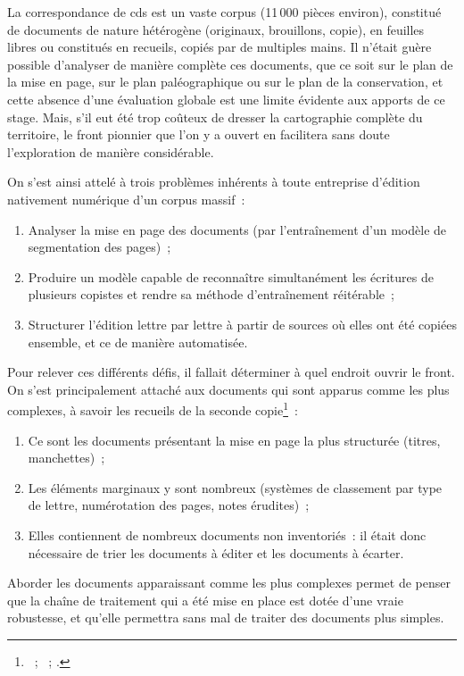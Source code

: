 \documentclass[a4paper,12pt,twoside]{book}
\begin{document}
		La correspondance de \gls{cds} est un vaste corpus (11\,000 pièces environ), constitué de documents de nature hétérogène (originaux, brouillons, copie), en feuilles libres ou constitués en recueils, copiés par de multiples mains. Il n'était guère possible d'analyser de manière complète ces documents, que ce soit sur le plan de la mise en page, sur le plan paléographique ou sur le plan de la conservation, et cette absence d'une évaluation globale est une limite évidente aux apports de ce stage. Mais, s'il eut été trop coûteux de dresser la cartographie complète du territoire, le front pionnier que l'on y a ouvert en facilitera sans doute l'exploration de manière considérable.
		
		On s'est ainsi attelé à trois problèmes inhérents à toute entreprise d'édition nativement numérique d'un corpus massif~: 
		
		\begin{enumerate}
			\item Analyser la mise en page des documents (par l'entraînement d'un modèle de segmentation des pages)~;
			\item Produire un modèle capable de reconnaître simultanément les écritures de plusieurs copistes et rendre sa méthode d'entraînement réitérable~;
			\item Structurer l'édition lettre par lettre à partir de sources où elles ont été copiées ensemble, et ce de manière automatisée.
		\end{enumerate}
		
		Pour relever ces différents défis, il fallait déterminer à quel endroit ouvrir le front. On s'est principalement attaché aux documents qui sont apparus comme les plus complexes, à savoir les recueils de la seconde copie\footnote{\cite{CdS02001330}~; \cite{CdS02001369}~; \cite{CdS02001334}.}~:
		
		\begin{enumerate}
			\item Ce sont les documents présentant la mise en page la plus structurée (titres, manchettes)~;
			\item Les éléments marginaux y sont nombreux (systèmes de classement par type de lettre, numérotation des pages, notes érudites)~;
			\item Elles contiennent de nombreux documents non inventoriés~: il était donc nécessaire de trier les documents à éditer et les documents à écarter.
		\end{enumerate}
		
		Aborder les documents apparaissant comme les plus complexes permet de penser que la chaîne de traitement qui a été mise en place est dotée d'une vraie robustesse, et qu'elle permettra sans mal de traiter des documents plus simples. 
		
\end{document}
